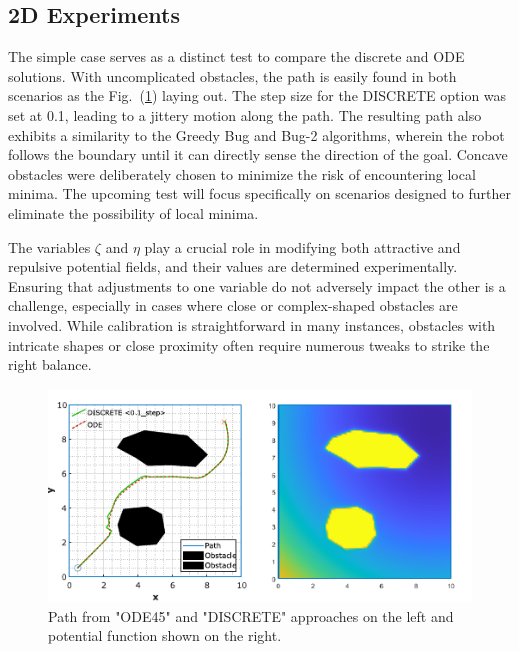 \documentclass{IEEEtaes}
\begin{document}
{\subsection{2D Experiments}

The simple case serves as a distinct test to compare the discrete and ODE solutions. With uncomplicated obstacles, the path is easily found in both scenarios as the Fig.~(\ref{simple}) laying out. The step size for the DISCRETE option was set at 0.1, leading to a jittery motion along the path. The resulting path also exhibits a similarity to the Greedy Bug and Bug-2 algorithms, wherein the robot follows the boundary until it can directly sense the direction of the goal. Concave obstacles were deliberately chosen to minimize the risk of encountering local minima. The upcoming test will focus specifically on scenarios designed to further eliminate the possibility of local minima.

The variables $\zeta$ and $\eta$ play a crucial role in modifying both attractive and repulsive potential fields, and their values are determined experimentally. Ensuring that adjustments to one variable do not adversely impact the other is a challenge, especially in cases where close or complex-shaped obstacles are involved. While calibration is straightforward in many instances, obstacles with intricate shapes or close proximity often require numerous tweaks to strike the right balance.

\begin{figure}[t]
    \begin{center}    
        \includegraphics[width=1\linewidth]{simple.pdf}
    \end{center}
     \caption{Path from "ODE45" and "DISCRETE" approaches on the left and potential function shown on the right.}
     \label{simple}
\end{figure}

}
\end{document}
